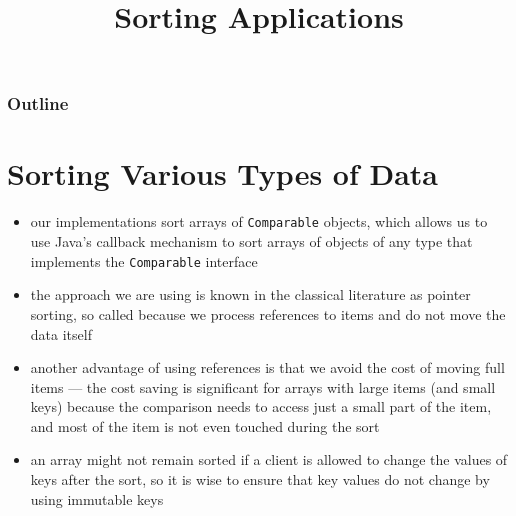 \documentclass[8pt,a4paper,compress]{beamer}
\title{Sorting Applications}
\date{}
\begin{document}
\begin{frame}
\vfill
\titlepage
\end{frame}

\begin{frame}
\frametitle{Outline}
\tableofcontents
\end{frame}

\section{Sorting Various Types of Data}
\begin{frame}[fragile]
\begin{itemize}
\item our implementations sort arrays of \lstinline$Comparable$ objects, which allows us to use Java's callback mechanism to sort arrays of objects of any type that implements the \lstinline$Comparable$ interface

\item the approach we are using is known in the classical literature as pointer sorting, so called because we process references to items and do not move the data itself

\item another advantage of using references is that we avoid the cost of moving full items --- the cost saving is significant for arrays with large items (and small keys) because the comparison needs to access just a small part of the item, and most of the item is not even touched during the sort

\item an array might not remain sorted if a client is allowed to change the values of keys after the sort, so it is wise to ensure that key values do not change by using immutable keys
\end{itemize}
\end{frame}
\end{document}
